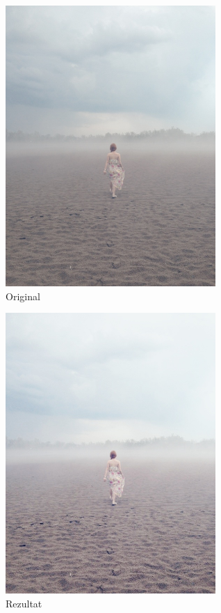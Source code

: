 \documentclass[12pt,a4paper]{article}
\theoremstyle{definition}
\theoremstyle{remark}
\theoremstyle{plain}
\begin{document}
\begin{multicols}{2}
\begin{figure}[H]
\centering
\includegraphics[width=8cm]{images/woman.jpeg}
  \caption{Original}\label{river}
\end{figure}
\columnbreak
\begin{figure}[H]
\centering
\includegraphics[width=8cm]{images/fuzzy_color_2.jpg}
  \caption{Rezultat}\label{woman_output}
\end{figure}
\end{multicols}
\end{document}
